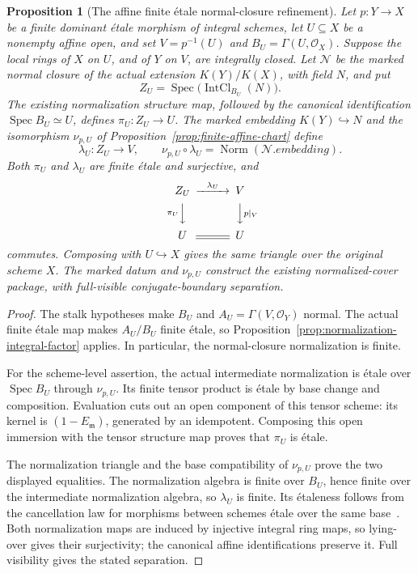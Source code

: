 \documentclass[11pt]{article}
\newtheorem{proposition}[theorem]{Proposition}
\theoremstyle{definition}
\theoremstyle{remark}
\DeclareMathOperator{\Spec}{Spec}
\begin{document}
\begin{proposition}[The affine finite \'{e}tale normal-closure refinement]
\label{prop:finite-etale-normal-closure-chart}
Let \(p:Y\to X\) be a finite dominant \'{e}tale morphism of integral
schemes, let \(U\subseteq X\) be a nonempty affine open, and set
\(V=p^{-1}(U)\) and \(B_U=\Gamma(U,\mathcal O_X)\).
Suppose the local rings of \(X\) on \(U\), and of \(Y\) on \(V\),
are integrally closed. Let \(\mathcal N\) be the marked normal closure
of the actual extension \(K(Y)/K(X)\), with field \(N\), and put
\[
  Z_U=\Spec\bigl(\operatorname{IntCl}_{B_U}(N)\bigr).
\]
The existing normalization structure map, followed by the canonical
identification \(\Spec B_U\simeq U\), defines
\(\pi_U:Z_U\to U\). The marked embedding \(K(Y)\hookrightarrow N\)
and the isomorphism \(\nu_{p,U}\) of
Proposition~\ref{prop:finite-affine-chart} define
\[
  \lambda_U:Z_U\longrightarrow V,\qquad
  \nu_{p,U}\circ\lambda_U
    =\operatorname{Norm}(\mathcal N.\mathit{embedding}).
\]
Both \(\pi_U\) and \(\lambda_U\) are finite \'{e}tale and surjective, and
\[
\begin{CD}
  Z_U @>{\lambda_U}>> V\\
  @V{\pi_U}VV @VV{p|_V}V\\
  U @= U
\end{CD}
\]
commutes. Composing with \(U\hookrightarrow X\) gives the same
triangle over the original scheme \(X\). The marked datum and
\(\nu_{p,U}\) construct the existing normalized-cover package,
with full-visible conjugate-boundary separation.
\end{proposition}

\begin{proof}
The stalk hypotheses make \(B_U\) and \(A_U=\Gamma(V,\mathcal O_Y)\)
normal. The actual finite \'{e}tale map makes \(A_U/B_U\) finite
\'{e}tale, so Proposition~\ref{prop:normalization-integral-factor}
applies. In particular, the normal-closure normalization is finite.

For the scheme-level assertion, the actual intermediate normalization
is \'{e}tale over \(\Spec B_U\) through \(\nu_{p,U}\). Its finite
tensor product is \'{e}tale by base change and composition. Evaluation
cuts out an open component of this tensor scheme: its kernel is
\((1-E_{\mathfrak m})\), generated by an idempotent. Composing this
open immersion with the tensor structure map proves that \(\pi_U\)
is \'{e}tale.

The normalization triangle and the base compatibility of
\(\nu_{p,U}\) prove the two displayed equalities. The normalization
algebra is finite over \(B_U\), hence finite over the intermediate
normalization algebra, so \(\lambda_U\) is finite. Its \'{e}taleness
follows from the cancellation law for morphisms between schemes
\'{e}tale over the same base~\cite{StacksEtaleCancellation}.
Both normalization maps are induced by injective integral ring maps,
so lying-over gives their surjectivity; the canonical affine
identifications preserve it.
Full visibility gives the stated separation.
\end{proof}
\end{document}

